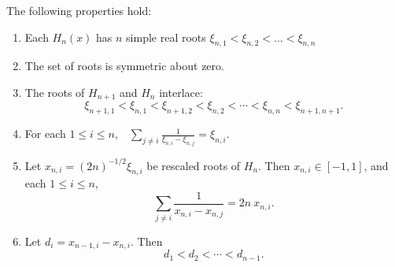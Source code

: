 \begin{lemma} The following properties hold: \label{lem:hermiteFacts}
\begin{enumerate}\renewcommand{\theenumi}{\alph{enumi}}
    \item Each $H_n(x)$ has $n$ simple real roots $\xi_{n,1}<\xi_{n,2}<\dots<\xi_{n,n}$ 
    \item The set of roots is symmetric about zero.
    \item The roots of $H_{n+1}$ and $H_n$ interlace: $$ \xi_{n+1,1} < \xi_{n,1} <\xi_{n+1,2}<\xi_{n,2} <\cdots <\xi_{n,n} < \xi_{n+1,n+1}. $$
    \item For each $1\leq i\leq n$,\ \  $\displaystyle \sum_{j\neq i} \frac{1}{\xi_{n,i}-\xi_{n,j}} = \xi_{n,i}.$ \label{fact:xiRootStietjes}
    
    \item \label{fact:rootStietjes}Let $x_{n,i} = {(2n)}^{-1/2}\xi_{n,i}$ be rescaled roots of $H_n$. Then $x_{n,i} \in [-1,1]$, and each $1\leq i\leq n$, $$\sum_{j\neq i} \frac{1}{x_{n,i}-x_{n,j}} = 2n \ x_{n,i}.$$ 
    \item \label{fact:diMonotone} Let $d_i = x_{n-1,i}-x_{n,i}$. Then $$d_1<d_2<\cdots<d_{n-1}.$$
    \end{enumerate}
\end{lemma}

